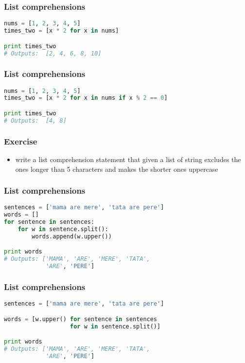 \documentclass{beamer}
\begin{document}
\begin{frame}[fragile]
\frametitle{List comprehensions}
\begin{lstlisting}[language=python]
nums = [1, 2, 3, 4, 5]
times_two = [x * 2 for x in nums]

print times_two
# Outputs:  [2, 4, 6, 8, 10]
\end{lstlisting}
\end{frame}

\begin{frame}[fragile]
\frametitle{List comprehensions}
\begin{lstlisting}[language=python]
nums = [1, 2, 3, 4, 5]
times_two = [x * 2 for x in nums if x % 2 == 0]

print times_two
# Outputs:  [4, 8]
\end{lstlisting}
\end{frame}

\begin{frame}[fragile]
\frametitle{Exercise}
\begin{itemize}
  \item write a list comprehension statement that given a list of string 
    excludes the ones longer than 5 characters
    and makes the shorter ones uppercase
\end{itemize}
\end{frame}

\begin{frame}[fragile]
\frametitle{List comprehensions}
\begin{lstlisting}[language=python]
sentences = ['mama are mere', 'tata are pere']
words = []
for sentence in sentences:
    for w in sentence.split():
        words.append(w.upper())

print words
# Outputs: ['MAMA', 'ARE', 'MERE', 'TATA',
            'ARE', 'PERE']

\end{lstlisting}
\end{frame}

\begin{frame}[fragile]
\frametitle{List comprehensions}
\begin{lstlisting}[language=python]
sentences = ['mama are mere', 'tata are pere']

words = [w.upper() for sentence in sentences
                   for w in sentence.split()]

print words
# Outputs: ['MAMA', 'ARE', 'MERE', 'TATA',
            'ARE', 'PERE']
\end{lstlisting}
\end{frame}
\end{document}
